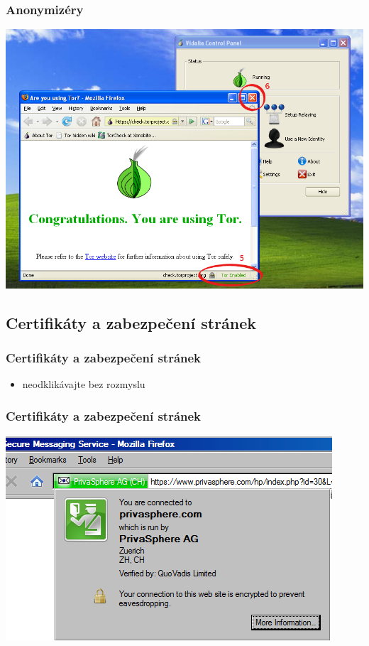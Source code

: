 \documentclass[xetex]{beamer}
\begin{document}
\begin{frame}
	\frametitle{Anonymizéry} 
	\includegraphics[scale=0.4]{pic/tor-xp.png}
\end{frame}

\subsection{Certifikáty a zabezpečení stránek}

\begin{frame}
	\frametitle{Certifikáty a zabezpečení stránek} 
	\begin{itemize} 
   		\item neodklikávajte bez rozmyslu
	\end{itemize} 
\end{frame}


\begin{frame}
	\frametitle{Certifikáty a zabezpečení stránek} 
	\includegraphics[scale=0.5]{pic/firefox-trust.png}
\end{frame}
\end{document}
